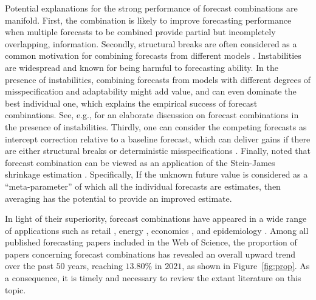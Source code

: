 \documentclass[a4paper,11pt]{article}
\begin{document}
Potential explanations for the strong performance of forecast combinations are manifold. First, the combination is likely to improve forecasting performance when multiple forecasts to be combined provide partial but incompletely overlapping, information. Secondly, structural breaks are often considered as a common motivation for combining forecasts from different models \citep{Timmermann2006-en}. Instabilities are widespread and known for being harmful to forecasting ability. In the presence of instabilities, combining forecasts from models with different degrees of misspecification and adaptability might add value, and can even dominate the best individual one, which explains the empirical success of forecast combinations. See, e.g., \citet{Rossi2013-fi,Rossi2021-fi} for an elaborate discussion on forecast combinations in the presence of instabilities. Thirdly, one can consider the competing forecasts as intercept correction relative to a baseline forecast, which can deliver gains if there are either structural breaks or deterministic misspecifications \citep{Hendry2004-pf}. Finally, \citet{Hendry2004-pf} noted that forecast combination can be viewed as an application of the Stein-James shrinkage estimation \citep{Judge1978-sr}. Specifically, If the unknown future value is considered as a ``meta-parameter'' of which all the individual forecasts are estimates, then averaging has the potential to provide an improved estimate.

In light of their superiority, forecast combinations have appeared in a wide range of applications such as retail \citep{Ma2021-np}, energy \citep{Xie2016-fb}, economics \citep{Aastveit2019-lf}, and epidemiology \citep{Ray2022-co}. Among all published forecasting papers included in the Web of Science, the proportion of papers concerning forecast combinations has revealed an overall upward trend over the past $50$ years, reaching $13.80\%$ in $2021$, as shown in Figure~\ref{fig:prop}. As a consequence, it is timely and necessary to review the extant literature on this topic.
\end{document}

